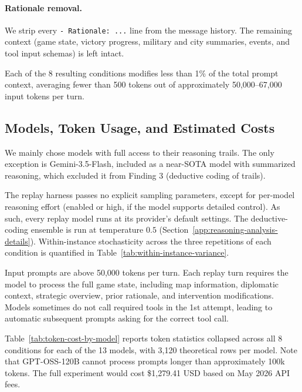 \paragraph{Rationale removal.} We strip every \texttt{- Rationale: ...} line from the message history. The remaining context (game state, victory progress, military and city summaries, events, and tool input schemas) is left intact.

Each of the 8 resulting conditions modifies less than 1\% of the total prompt context, averaging fewer than 500 tokens out of approximately 50,000--67,000 input tokens per turn.

\subsection{Models, Token Usage, and Estimated Costs}

We mainly chose models with full access to their reasoning trails. The only exception is Gemini-3.5-Flash, included as a near-SOTA model with summarized reasoning, which excluded it from Finding 3 (deductive coding of trails). 

The replay harness passes no explicit sampling parameters, except for per-model reasoning effort (enabled or high, if the model supports detailed control). As such, every replay model runs at its provider's default settings. The deductive-coding ensemble is run at temperature $0.5$ (Section~\ref{app:reasoning-analysis-details}). Within-instance stochasticity across the three repetitions of each condition is quantified in Table~\ref{tab:within-instance-variance}.

Input prompts are above 50,000 tokens per turn. Each replay turn requires the model to process the full game state, including map information, diplomatic context, strategic overview, prior rationale, and intervention modifications. Models sometimes do not call required tools in the 1st attempt, leading to automatic subsequent prompts asking for the correct tool call. 

Table~\ref{tab:token-cost-by-model} reports token statistics collapsed across all 8 conditions for each of the 13 models, with 3,120 theoretical rows per model. Note that GPT-OSS-120B cannot process prompts longer than approximately 100k tokens. The full experiment would cost \$1,279.41 USD based on May 2026 API fees. 

